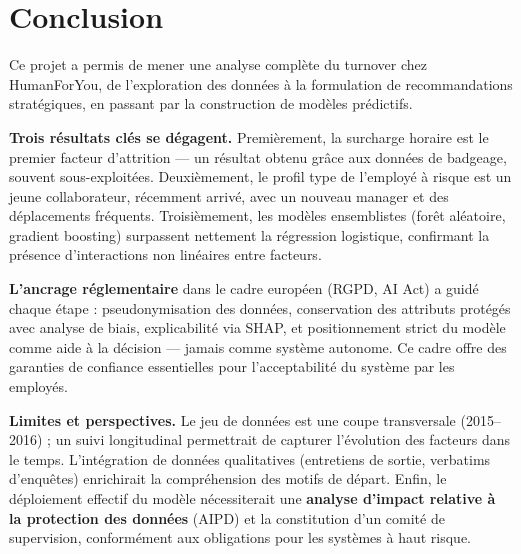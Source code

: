 \documentclass[12pt,a4paper]{article}
\begin{document}
\section{Conclusion}

Ce projet a permis de mener une analyse complète du turnover chez HumanForYou, de l'exploration des données à la formulation de recommandations stratégiques, en passant par la construction de modèles prédictifs.

\textbf{Trois résultats clés se dégagent.} Premièrement, la surcharge horaire est le premier facteur d'attrition --- un résultat obtenu grâce aux données de badgeage, souvent sous-exploitées. Deuxièmement, le profil type de l'employé à risque est un jeune collaborateur, récemment arrivé, avec un nouveau manager et des déplacements fréquents. Troisièmement, les modèles ensemblistes (forêt aléatoire, gradient boosting) surpassent nettement la régression logistique, confirmant la présence d'interactions non linéaires entre facteurs.

\textbf{L'ancrage réglementaire} dans le cadre européen (RGPD, AI Act) a guidé chaque étape : pseudonymisation des données, conservation des attributs protégés avec analyse de biais, explicabilité via SHAP, et positionnement strict du modèle comme aide à la décision --- jamais comme système autonome. Ce cadre offre des garanties de confiance essentielles pour l'acceptabilité du système par les employés.

\textbf{Limites et perspectives.} Le jeu de données est une coupe transversale (2015--2016) ; un suivi longitudinal permettrait de capturer l'évolution des facteurs dans le temps. L'intégration de données qualitatives (entretiens de sortie, verbatims d'enquêtes) enrichirait la compréhension des motifs de départ. Enfin, le déploiement effectif du modèle nécessiterait une \textbf{analyse d'impact relative à la protection des données} (AIPD) et la constitution d'un comité de supervision, conformément aux obligations pour les systèmes à haut risque.
\end{document}
